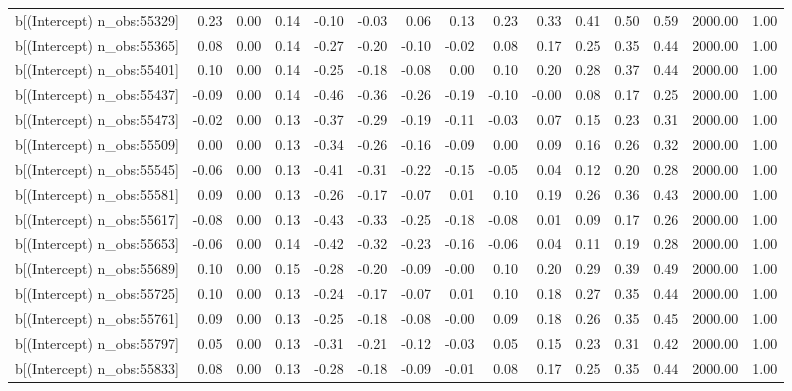 \begin{table}[ht]
\begin{tabular}{rrrrrrrrrrrrrrr}
  b[(Intercept) n\_obs:55329] & 0.23 & 0.00 & 0.14 & -0.10 & -0.03 & 0.06 & 0.13 & 0.23 & 0.33 & 0.41 & 0.50 & 0.59 & 2000.00 & 1.00 \\ 
  b[(Intercept) n\_obs:55365] & 0.08 & 0.00 & 0.14 & -0.27 & -0.20 & -0.10 & -0.02 & 0.08 & 0.17 & 0.25 & 0.35 & 0.44 & 2000.00 & 1.00 \\ 
  b[(Intercept) n\_obs:55401] & 0.10 & 0.00 & 0.14 & -0.25 & -0.18 & -0.08 & 0.00 & 0.10 & 0.20 & 0.28 & 0.37 & 0.44 & 2000.00 & 1.00 \\ 
  b[(Intercept) n\_obs:55437] & -0.09 & 0.00 & 0.14 & -0.46 & -0.36 & -0.26 & -0.19 & -0.10 & -0.00 & 0.08 & 0.17 & 0.25 & 2000.00 & 1.00 \\ 
  b[(Intercept) n\_obs:55473] & -0.02 & 0.00 & 0.13 & -0.37 & -0.29 & -0.19 & -0.11 & -0.03 & 0.07 & 0.15 & 0.23 & 0.31 & 2000.00 & 1.00 \\ 
  b[(Intercept) n\_obs:55509] & 0.00 & 0.00 & 0.13 & -0.34 & -0.26 & -0.16 & -0.09 & 0.00 & 0.09 & 0.16 & 0.26 & 0.32 & 2000.00 & 1.00 \\ 
  b[(Intercept) n\_obs:55545] & -0.06 & 0.00 & 0.13 & -0.41 & -0.31 & -0.22 & -0.15 & -0.05 & 0.04 & 0.12 & 0.20 & 0.28 & 2000.00 & 1.00 \\ 
  b[(Intercept) n\_obs:55581] & 0.09 & 0.00 & 0.13 & -0.26 & -0.17 & -0.07 & 0.01 & 0.10 & 0.19 & 0.26 & 0.36 & 0.43 & 2000.00 & 1.00 \\ 
  b[(Intercept) n\_obs:55617] & -0.08 & 0.00 & 0.13 & -0.43 & -0.33 & -0.25 & -0.18 & -0.08 & 0.01 & 0.09 & 0.17 & 0.26 & 2000.00 & 1.00 \\ 
  b[(Intercept) n\_obs:55653] & -0.06 & 0.00 & 0.14 & -0.42 & -0.32 & -0.23 & -0.16 & -0.06 & 0.04 & 0.11 & 0.19 & 0.28 & 2000.00 & 1.00 \\ 
  b[(Intercept) n\_obs:55689] & 0.10 & 0.00 & 0.15 & -0.28 & -0.20 & -0.09 & -0.00 & 0.10 & 0.20 & 0.29 & 0.39 & 0.49 & 2000.00 & 1.00 \\ 
  b[(Intercept) n\_obs:55725] & 0.10 & 0.00 & 0.13 & -0.24 & -0.17 & -0.07 & 0.01 & 0.10 & 0.18 & 0.27 & 0.35 & 0.44 & 2000.00 & 1.00 \\ 
  b[(Intercept) n\_obs:55761] & 0.09 & 0.00 & 0.13 & -0.25 & -0.18 & -0.08 & -0.00 & 0.09 & 0.18 & 0.26 & 0.35 & 0.45 & 2000.00 & 1.00 \\ 
  b[(Intercept) n\_obs:55797] & 0.05 & 0.00 & 0.13 & -0.31 & -0.21 & -0.12 & -0.03 & 0.05 & 0.15 & 0.23 & 0.31 & 0.42 & 2000.00 & 1.00 \\ 
  b[(Intercept) n\_obs:55833] & 0.08 & 0.00 & 0.13 & -0.28 & -0.18 & -0.09 & -0.01 & 0.08 & 0.17 & 0.25 & 0.35 & 0.44 & 2000.00 & 1.00 \\ 

\end{tabular}
\end{table}
